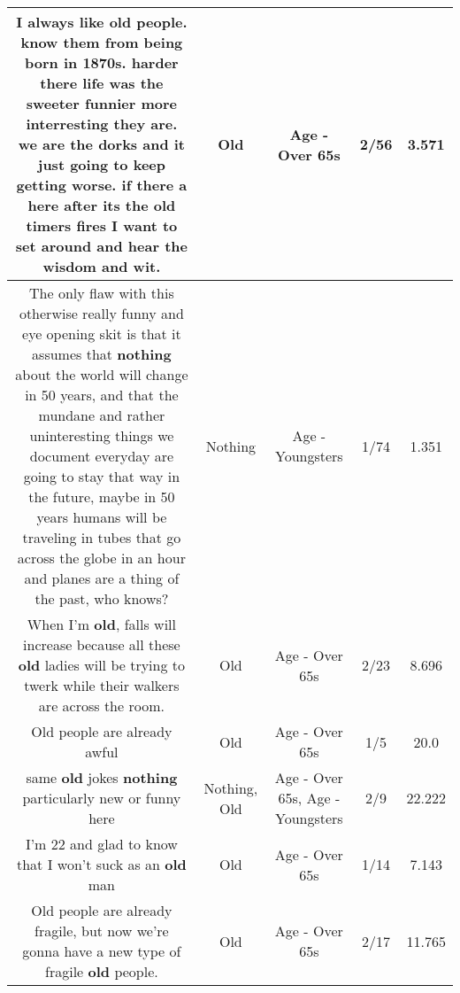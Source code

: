 \documentclass[11pt]{article}
\newlength\mylength
\begin{document}
\begin{center}
\begin{longtable}{|C{.65\mylength}|C{.30\mylength}|C{.12\mylength}|C{.12\mylength}|C{.12\mylength}|}
  \small I always like \textbf{old} people. know them from being born in 1870s. harder there life was the sweeter funnier more interresting they are. we are the dorks and it just going to keep getting worse. if there a here after its the \textbf{old} timers fires I want to set around and hear the wisdom and wit.\normalsize   & Old & Age - Over 65s & 2/56 & 3.571 \\  \hline
  \small The only flaw with this otherwise really funny and eye opening skit is that it assumes that \textbf{nothing} about the world will change in 50 years, and that the mundane and rather uninteresting things we document everyday are going to stay that way in the future, maybe in 50 years humans will be traveling in tubes that go across the globe in an hour and planes are a thing of the past, who knows?\normalsize   & Nothing & Age - Youngsters & 1/74 & 1.351 \\  \hline
  \small When I'm \textbf{old}, falls will increase because all these \textbf{old} ladies will be trying to twerk while their walkers are across the room.\normalsize   & Old & Age - Over 65s & 2/23 & 8.696 \\  \hline
  \small Old people are already awful\normalsize   & Old & Age - Over 65s & 1/5 & 20.0 \\  \hline
  \small same \textbf{old} jokes \textbf{nothing} particularly new or funny here\normalsize   & Nothing, Old & Age - Over 65s, Age - Youngsters & 2/9 & 22.222 \\  \hline
  \small I'm 22 and glad to know that I won't suck as an \textbf{old} man\normalsize   & Old & Age - Over 65s & 1/14 & 7.143 \\  \hline
  \small Old people are already fragile, but now we're gonna have a new type of fragile \textbf{old} people.\normalsize   & Old & Age - Over 65s & 2/17 & 11.765 \\  \hline

\end{longtable}
\end{center}
\end{document}
